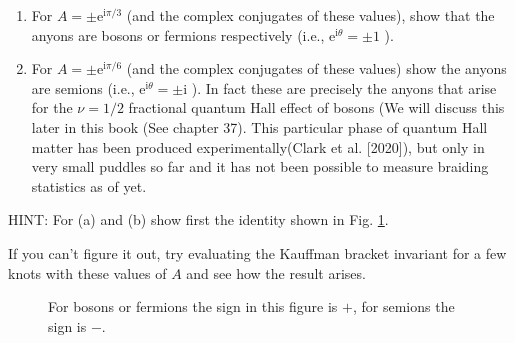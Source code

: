 \begin{enumerate}
        \item For $A=\pm \mathrm{e}^{\mathrm{i} \pi /3}$ (and the complex conjugates of these values), show that the anyons are bosons or fermions respectively (i.e., $\mathrm{e}^{\mathrm{i} \theta } =\pm 1$ ).
        \item For $A=\pm \mathrm{e}^{\mathrm{i} \pi /6}$ (and the complex conjugates of these values) show the anyons are semions (i.e., $\mathrm{e}^{\mathrm{i} \theta } =\pm \mathrm{i}$ ). In fact these are precisely the anyons that arise for the $\nu =1/2$ fractional quantum Hall effect of bosons (We will discuss this later in this book (See chapter 37). This particular phase of quantum Hall matter has been produced experimentally(Clark et al. [2020]), but only in very small puddles so far and it has not been possible to measure braiding statistics as of yet.
\end{enumerate}
HINT: For (a) and (b) show first the identity shown in Fig. \ref{fig:ExchangeBosonsOrFermions}.

If you can't figure it out, try evaluating the Kauffman bracket invariant for a few knots with these values of $A$ and see how the result arises.

\begin{figure}[h!]
        \centering
        \caption{For bosons or fermions the sign in this figure is $+$, for semions the sign is $-$.}
        \label{fig:ExchangeBosonsOrFermions}
\end{figure}

